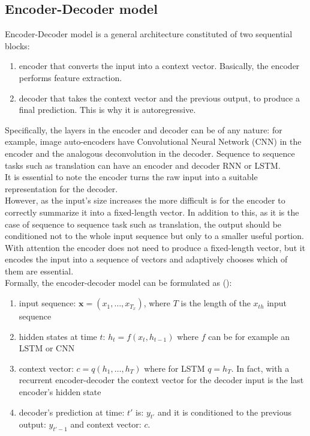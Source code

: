 \documentclass[LaM,binding=0.6cm]{sapthesis}
\begin{document}
\subsection{Encoder-Decoder model}
Encoder-Decoder model is a general architecture constituted of two sequential blocks:
\begin{enumerate}
\item encoder that converts the input into a context vector. Basically, the encoder performs feature extraction.
\item decoder that takes the context vector and the previous output, to produce a final prediction. This is why it is autoregressive.
\end{enumerate}
Specifically, the layers in the encoder and decoder can be of any nature: for example, image auto-encoders have Convolutional Neural Network (CNN) in the encoder and the analogous deconvolution in the decoder. Sequence to sequence tasks such as translation can have an encoder and decoder RNN or LSTM.\\It is essential to note the encoder turns the raw input into a suitable representation for the decoder.\\However, as the input's size increases the more difficult is for the encoder to correctly summarize it into a fixed-length vector. In addition to this, as it is the case of sequence to sequence task such as translation, the output should be conditioned not to the whole input sequence but only to a smaller useful portion.\\With attention the encoder does not need to produce a fixed-length vector, but it encodes the input into a sequence of vectors and adaptively chooses which of them are essential.\\Formally, the encoder-decoder model can be formulated as (\cite{bah}):
\begin{enumerate}
\item input sequence: $\textbf{x}=(x_1,\dots,x_{T_{x}})$, where $T$ is the length of the $x_{th}$ input sequence
\item hidden states at time $t$: $h_t=f(x_t,h_{t-1})$ where $f$ can be for example an LSTM or CNN
\item context vector: $c=q(h_1,\dots,h_{T})$ where for LSTM $q=h_{T}$. In fact, with a recurrent encoder-decoder the context vector for the decoder input is the last encoder's hidden state
\item decoder's prediction at time: $t'$ is: $y_{t'}$ and it is conditioned to the previous output: $y_{t'-1}$ and context vector: $c$.
\end{enumerate}
\end{document}

